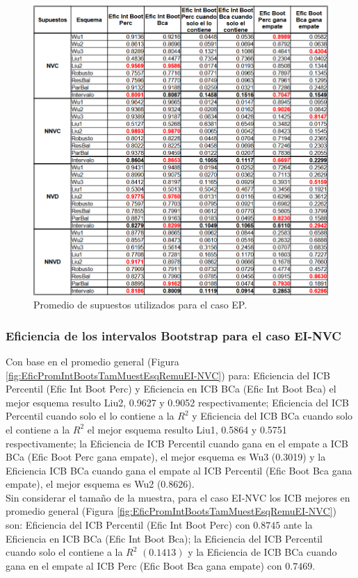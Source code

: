 \begin{figure}[ht] 
	\centering 
	\includegraphics[width=0.80\linewidth]{img/EP_Prom_Supuestos.png} 
	\caption{Promedio de supuestos utilizados para el caso EP.} 
	\label{fig:PromSupuUtiliEP}
\end{figure}
\FloatBarrier





\subsubsection{Eficiencia de los intervalos Bootstrap para el caso EI-NVC}
Con base en el promedio general (Figura \ref{fig:EficPromIntBootsTamMuestEsqRemuEI-NVC}) para: Eficiencia del ICB Percentil (Efic Int Boot Perc) y Eficiencia en ICB BCa (Efic Int Boot Bca) el mejor esquema resulto Liu2, 0.9627 y 0.9052 respectivamente;
 Eficiencia del ICB Percentil cuando solo el lo contiene a la $R^{2}$ y Eficiencia del ICB BCa cuando solo el contiene a la $R^{2}$ el mejor esquema resulto Liu1, 0.5864 y 0.5751 respectivamente; 
 la Eficiencia de ICB Percentil cuando gana en el empate a ICB BCa (Efic Boot Perc gana empate), el mejor esquema es Wu3 (0.3019) y la Eficiencia ICB BCa cuando gana el empate al ICB Percentil (Efic Boot Bca gana empate), el mejor esquema es Wu2 (0.8626).\\


Sin considerar el tamaño de la muestra, para el caso EI-NVC los ICB mejores en promedio general (Figura \ref{fig:EficPromIntBootsTamMuestEsqRemuEI-NVC}) son: Eficiencia del ICB Percentil (Efic Int Boot Perc) con $0.8745$ ante la Eficiencia en ICB BCa (Efic Int Boot Bca); la Eficiencia del ICB Percentil cuando solo el contiene a la $R^{2}$ $(0.1413)$ y la Eficiencia de ICB BCa cuando gana en el empate al ICB Perc (Efic Boot Bca gana empate) con $0.7469$.


